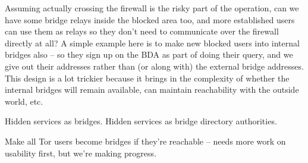 \documentclass{llncs}
\begin{document}
Assuming actually crossing the firewall is the risky part of the
operation, can we have some bridge relays inside the blocked area too,
and more established users can use them as relays so they don't need to
communicate over the firewall directly at all? A simple example here is
to make new blocked users into internal bridges also -- so they sign up
on the BDA as part of doing their query, and we give out their addresses
rather than (or along with) the external bridge addresses. This design
is a lot trickier because it brings in the complexity of whether the
internal bridges will remain available, can maintain reachability with
the outside world, etc.

Hidden services as bridges. Hidden services as bridge directory authorities.

Make all Tor users become bridges if they're reachable -- needs more work
on usability first, but we're making progress.

 
\end{document}
